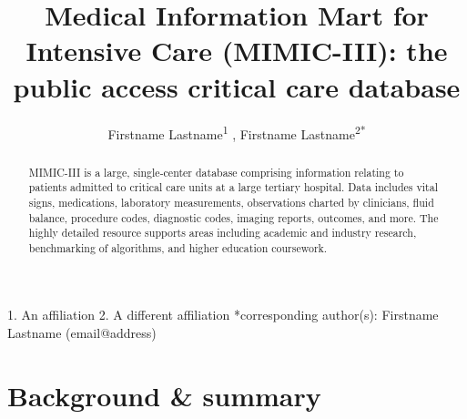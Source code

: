 \documentclass[english]{article}
\begin{document}
\title{Medical Information Mart for Intensive Care (MIMIC-III): the public access critical care database}

\author{
Firstname Lastname\textsuperscript{1}
, Firstname Lastname\textsuperscript{2{*}}
}

\maketitle
\thispagestyle{fancy}

1. An affiliation 2. A different affiliation {*}corresponding author(s):
Firstname Lastname (email@address)

\begin{abstract} %
MIMIC-III is a large, single-center database comprising information relating to patients admitted to critical care units at a large tertiary hospital. Data includes vital signs, medications, laboratory measurements, observations charted by clinicians, fluid balance, procedure codes, diagnostic codes, imaging reports, outcomes, and more. The highly detailed resource supports areas including academic and industry research, benchmarking of algorithms, and higher education coursework.
\end{abstract}

\section*{Background \& summary} %

\end{document}
